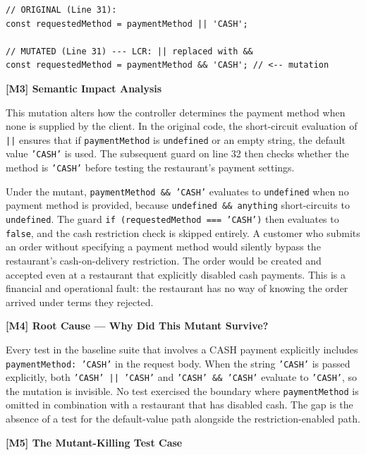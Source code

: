 \documentclass[12pt, a4paper]{article}
\begin{document}
\begin{lstlisting}[caption={Mutant 1: Original vs Mutated (Line 31)}]
// ORIGINAL (Line 31):
const requestedMethod = paymentMethod || 'CASH';

// MUTATED (Line 31) --- LCR: || replaced with &&
const requestedMethod = paymentMethod && 'CASH'; // <-- mutation
\end{lstlisting}

\textbf{[M3] Semantic Impact Analysis}

This mutation alters how the controller determines the payment method when none is supplied by the client. In the original code, the short-circuit evaluation of \texttt{||} ensures that if \texttt{paymentMethod} is \texttt{undefined} or an empty string, the default value \texttt{'CASH'} is used. The subsequent guard on line 32 then checks whether the method is \texttt{'CASH'} before testing the restaurant's payment settings.

Under the mutant, \texttt{paymentMethod \&\& 'CASH'} evaluates to \texttt{undefined} when no payment method is provided, because \texttt{undefined \&\& anything} short-circuits to \texttt{undefined}. The guard \texttt{if (requestedMethod === 'CASH')} then evaluates to \texttt{false}, and the cash restriction check is skipped entirely. A customer who submits an order without specifying a payment method would silently bypass the restaurant's cash-on-delivery restriction. The order would be created and accepted even at a restaurant that explicitly disabled cash payments. This is a financial and operational fault: the restaurant has no way of knowing the order arrived under terms they rejected.

\textbf{[M4] Root Cause --- Why Did This Mutant Survive?}

Every test in the baseline suite that involves a CASH payment explicitly includes \texttt{paymentMethod: 'CASH'} in the request body. When the string \texttt{'CASH'} is passed explicitly, both \texttt{'CASH' || 'CASH'} and \texttt{'CASH' \&\& 'CASH'} evaluate to \texttt{'CASH'}, so the mutation is invisible. No test exercised the boundary where \texttt{paymentMethod} is omitted in combination with a restaurant that has disabled cash. The gap is the absence of a test for the default-value path alongside the restriction-enabled path.

\textbf{[M5] The Mutant-Killing Test Case}
\end{document}
